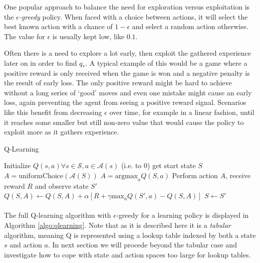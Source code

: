 One popular approach to balance the need
for exploration versus exploitation is
the \textit{$\epsilon$-greedy} policy.
When faced with a choice between actions,
it will select the best known action
with a chance of $1-\epsilon$
and select a random action otherwise.
The value for $\epsilon$ is usually kept low,
like $0.1$.

Often there is a need to explore a lot early,
then exploit the gathered experience later on
in order to find $q_*$.
A typical example of this would be a game
where a positive reward is only received when the game is won
and a negative penalty is the result of early loss.
The only positive reward might be hard to achieve
without a long series of `good' moves
and even one mistake might cause an early loss,
again preventing the agent from seeing a positive reward signal.
Scenarios like this benefit from decreasing $\epsilon$ over time,
for example in a linear fashion,
until it reaches some smaller but still non-zero value
that would cause the policy to exploit more
as it gathers experience.


\begin{algorithm}
  \caption{Q-Learning}
\label{algo:qlearning}
\begin{algorithmic}
  \State Initialize $Q(s,a) \forall s \in \mathcal{S}, a \in \mathcal{A}(s)$ (i.e. to 0)
    \State get start state $S$
        \State $A = \text{uniformChoice}(\mathcal{A}(S))$
      \Else
      \State $A = \text{argmax}_a Q(S, a)$
      \EndIf
      \State Perform action $A$, receive reward $R$ and observe state $S'$
      \State $Q(S, A) \gets Q(S, A) + \alpha \left[ R + \gamma \text{max}_a Q(S', a) - Q(S, A) \right]$
      \State $S \gets S'$
    \EndWhile
  \EndFor
\end{algorithmic}
\end{algorithm}

\paragraph{}
The full Q-learning algorithm
with $\epsilon$-greedy for a learning policy
is displayed in Algorithm \ref{algo:qlearning}.
Note that as it is described here it is a \textit{tabular} algorithm,
meaning Q is represented using a lookup table
indexed by both a state $s$ and action $a$.
In next section we will procede beyond the tabular case
and investigate how to cope with
state and action spaces too large for lookup tables.

